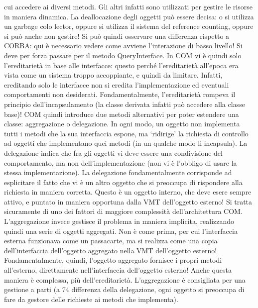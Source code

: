 cui accedere ai diversi metodi. Gli
altri infatti sono utilizzati per gestire le risorse in maniera dinamica.
La deallocazione degli oggetti può essere decisa: o si utilizza un garbage colo
lector, oppure si utilizza il sistema del reference counting, oppure si può anche
non gestire! Si può quindi osservare una differenza rispetto a CORBA: qui è
necessario vedere come avviene l'interazione di basso livello! Si deve per forza
passare per il metodo QueryInterface.
In COM vi è quindi solo l'ereditarietà in base alle interfacce: questo perché
l'ereditarietà all'epoca era vista come un sistema troppo accoppiante, e quindi da
limitare. Infatti, ereditando solo le interfacce non si eredita l'implementazione
ed eventuali comportamenti non desiderati. Fondamentalmente, l'ereditarietà
rompeva il principio dell'incapsulamento (la classe derivata infatti può accedere
alla classe base)!
COM quindi introduce due metodi alternativi per poter estendere una classe:
aggregazione o delegazione. In ogni modo, un oggetto non implementa tutti i
metodi che la sua interfaccia espone, ma {`}ridirige' la richiesta di controllo ad
oggetti che implementano quei metodi (in un qualche modo li incapsula).
La delegazione indica che fra gli oggetti vi deve essere una condivisione
del comportamento, ma non dell'implementazione (non vi è l'obbligo di usare
la stessa implementazione). La delegazione fondamentalmente corrisponde ad
esplicitare il fatto che vi è un altro oggetto che si preoccupa di rispondere
alla richiesta in maniera corretta. Questo è un oggetto interno, che deve esere
sempre attivo, e puntato in maniera opportuna dalla VMT dell'oggetto esterno!
Si tratta sicuramente di uno dei fattori di maggiore complessità dell'architettura
COM.
L'aggregazione invece gestisce il problema in maniera implicita, realizzando
quindi una serie di oggetti aggregati. Non è come prima, per cui l'interfaccia
esterna funzionava come un passacarte, ma si realizza come una copia dell'interfaccia dell'oggetto aggregato nella VMT
dell'oggetto esterno! Fondamentalmente, quindi, l'oggetto aggregato fornisce i propri metodi all'esterno, direttamente
nell'interfaccia dell'oggetto esterno! Anche questa maniera è complessa,
più dell'ereditarietà. L'aggregazione è consigliata per una gestione a parti (a
74
differenza della delegazione, ogni oggetto si preoccupa di fare da gestore delle
richieste ai metodi che implementa).
